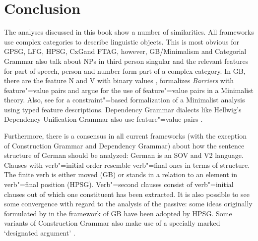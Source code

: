 \chapter{Conclusion}

The analyses discussed in this book show a number of similarities. All frameworks use complex
categories to describe linguistic objects. This is most obvious for GPSG\indexgpsg,
LFG\indexlfg, HPSG\indexhpsg, CxG\indexcxg and FTAG\indextag, however, GB/Minimalism and Categorial Grammar also talk about NPs in third person singular and the relevant features for part of
speech, person and number form part of a complex category. In GB, there are the feature N and V with binary values \citep[]{Chomsky70a}, \citet[]{Stabler92a-u} formalizes \emph{Barriers} with feature"=value pairs and \citet[--291]{SE2002a} argue for the use of feature"=value pairs in a Minimalist theory\indexmp. Also, see \citet[\page]{Veenstra98a} for a constraint"=based formalization
of a Minimalist analysis using typed feature descriptions. Dependency Grammar dialects like
Hellwig's Dependency Unification Grammar also use feature"=value
pairs \citep[]{Hellwig2003a}.

Furthermore, there is a consensus in all current frameworks (with the exception of Construction
Grammar and Dependency Grammar) about how the sentence structure of German should
be analyzed: German is an SOV and V2 language. Clauses with verb"=initial order resemble verb"=final ones in terms of structure. The finite verb is
either moved (GB) or stands in a relation to an element in verb"=final position (HPSG). Verb"=second
clauses consist of  verb"=initial clauses out of which one constituent has been extracted. It is also possible to see some convergence with regard to the analysis of the passive: some ideas originally formulated
by \citet{Haider84b,Haider85b,Haider86} in the framework of GB have been adopted by HPSG. Some
variants of Construction Grammar also make use of a specially marked `designated
argument' \citep[--57]{MR2001a}.

